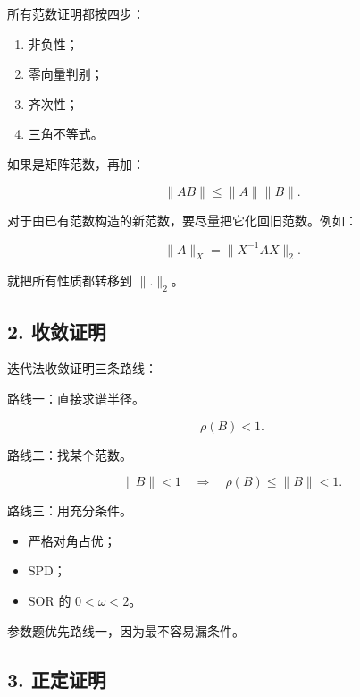 \documentclass[11pt,a4paper]{ctexart}
\begin{document}

所有范数证明都按四步：

\begin{enumerate}

\item 非负性；

\item 零向量判别；

\item 齐次性；

\item 三角不等式。

\end{enumerate}

如果是矩阵范数，再加：

\[
\|AB\|\le \|A\|\|B\|.
\]

对于由已有范数构造的新范数，要尽量把它化回旧范数。例如：

\[
\|A\|_X=\|X^{-1}AX\|_2.
\]

就把所有性质都转移到 $\|.\|_2$。


\subsection*{2. 收敛证明}


迭代法收敛证明三条路线：

路线一：直接求谱半径。

\[
\rho(B)<1.
\]

路线二：找某个范数。

\[
\|B\|<1\quad \Rightarrow\quad \rho(B)\le \|B\|<1.
\]

路线三：用充分条件。

\begin{itemize}

\item 严格对角占优；

\item SPD；

\item SOR 的 $0<\omega<2$。

\end{itemize}

参数题优先路线一，因为最不容易漏条件。


\subsection*{3. 正定证明}
\end{document}
